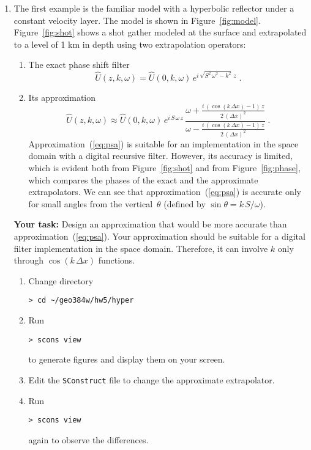 \begin{enumerate}

\item The first example is the familiar model with a hyperbolic
  reflector under a constant velocity layer.  The model is shown in
  Figure~\ref{fig:model}. Figure~\ref{fig:shot} shows a shot gather
  modeled at the surface and extrapolated to a level of 1 km in depth
  using two extrapolation operators: 
  \begin{enumerate}
  \item The exact phase shift filter
    \begin{equation}
      \label{eq:ps}
      \hat{U}(z,k,\omega) = \hat{U}(0,k,\omega)\,e^{i\,\sqrt{S^2\,\omega^2 - k^2}\,z}\;.
    \end{equation}
  \item Its approximation
    \begin{equation}
      \label{eq:psa}
      \hat{U}(z,k,\omega) \approx \hat{U}(0,k,\omega)\,
      e^{i\,S\,\omega\,z}\,
      \frac
      {\displaystyle \omega + \frac{i\,\left(\cos{(k\,\Delta x)}-1\right)\,z}{2\,(\Delta x)^2}}
      {\displaystyle \omega - \frac{i\,\left(\cos{(k\,\Delta x)}-1\right)\,z}{2\,(\Delta x)^2}}\;.
    \end{equation}
    Approximation~(\ref{eq:psa}) is suitable for an implementation in the space domain
    with a digital recursive filter. However, its accuracy is limited,
    which is evident both from Figure~\ref{fig:shot} and from
    Figure~\ref{fig:phase}, which compares the phases of the exact and
    the approximate extrapolators. We can see that
    approximation~(\ref{eq:psa}) is accurate only for small angles
    from the vertical~$\theta$ (defined by $\sin{\theta} = k\,S/\omega$). 
  \end{enumerate}

  \textbf{Your task:} Design an approximation that would be more accurate
    than approximation~(\ref{eq:psa}). Your approximation should be
    suitable for a digital filter implementation in the space
    domain. Therefore, it can involve $k$ only through $\cos{(k\,\Delta
      x)}$ functions.
    \begin{enumerate}
    \item Change directory 
\begin{verbatim}
> cd ~/geo384w/hw5/hyper
\end{verbatim}
    \item Run
\begin{verbatim}
> scons view
\end{verbatim}
      to generate figures and display them on your screen.  
    \item Edit the \texttt{SConstruct} file to change the approximate extrapolator.
    \item Run
\begin{verbatim}
> scons view
\end{verbatim}
      again to observe the differences.
    \end{enumerate}


\end{enumerate}
